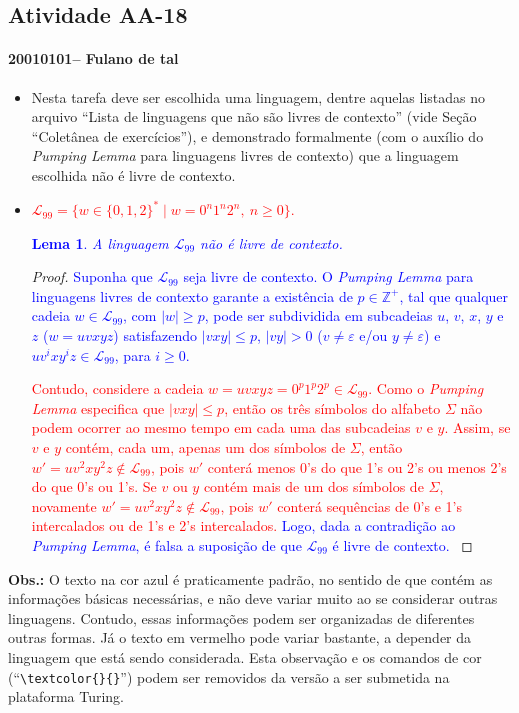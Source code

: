 \documentclass[12pt]{article}
\def\discente{Fulano de tal}
\def\matricula{20010101}
\def\aa{18}
\def\myling{{99}} %
\newtheorem{lema}{Lema}
\begin{document}
\subsection*{Atividade AA-\aa}
 \paragraph{\matricula -- \discente}
%
 \begin{itemize}
  \item Nesta tarefa deve ser escolhida uma linguagem, dentre aquelas listadas no arquivo ``Lista de linguagens que não são livres de contexto'' (vide Seção ``Coletânea de exercícios''), e demonstrado formalmente (com o auxílio do \emph{Pumping Lemma} para linguagens livres de contexto) que a linguagem escolhida não é livre de contexto.
%  
  \item \textcolor{red}{$\mathcal{L}_{\myling} = \{w\in\{0,1,2\}^*\mid w = 0^n1^n2^n,\ n \geqslant 0\}$.}
%
  \textcolor{blue}{
  \begin{lema}
  A linguagem $\mathcal{L}_{\myling}$ não é livre de contexto.
  \end{lema}}
%
  \begin{proof}
  \textcolor{blue}{Suponha que $\mathcal{L}_{\myling}$ seja livre de contexto. O \emph{Pumping Lemma} para linguagens livres de contexto garante a existência de $p\in\mathbb{Z}^+$, tal que qualquer cadeia $w\in \mathcal{L}_{\myling}$, com $|w|\geqslant p$, pode ser subdividida em subcadeias $u$, $v$, $x$, $y$ e $z$ ($w=uvxyz$) satisfazendo $|vxy|\leqslant p$, $|vy|>0$ ($v\neq\varepsilon$ e/ou $y\neq\varepsilon$) e $uv^ixy^iz\in \mathcal{L}_{\myling}$, para $i\geqslant 0$.}
  
  \textcolor{red}{Contudo, considere a cadeia $w=uvxyz=0^p1^p2^p\in \mathcal{L}_{\myling}$. Como o \emph{Pumping Lemma} especifica que $|vxy|\leqslant p$, então os três símbolos do alfabeto $\Sigma$ não podem ocorrer ao mesmo tempo em cada uma das subcadeias $v$ e $y$. Assim, se $v$ e $y$ contém, cada um, apenas um dos símbolos de $\Sigma$, então $w'=uv^2xy^2z\notin \mathcal{L}_{\myling}$, pois $w'$ conterá menos 0's do que 1's ou 2's ou menos 2's do que 0's ou 1's. Se $v$ ou $y$ contém mais de um dos símbolos de $\Sigma$, novamente $w'=uv^2xy^2z\notin \mathcal{L}_{\myling}$, pois $w'$ conterá sequências de 0's e 1's intercalados ou de 1's e 2's intercalados.} \textcolor{blue}{Logo, dada a contradição ao \emph{Pumping Lemma}, é falsa a suposição de que $\mathcal{L}_{\myling}$ é livre de contexto. }
  \end{proof}
\end{itemize}
%
\noindent\textbf{Obs.:} O texto na cor azul é praticamente padrão, no sentido de que contém as informações básicas necessárias, e não deve variar muito ao se considerar outras linguagens. Contudo, essas informações podem ser organizadas de diferentes outras formas. Já o texto em vermelho pode variar bastante, a depender da linguagem que está sendo considerada. Esta observação e os comandos de cor (``\verb|\textcolor{}{}|'') podem ser removidos da versão a ser submetida na plataforma Turing.
\end{document}
